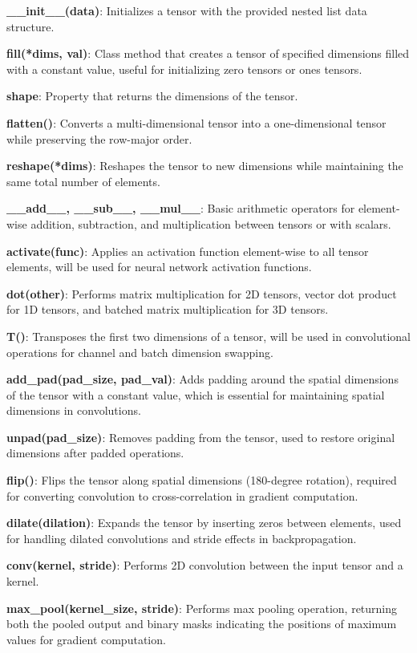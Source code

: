 \documentclass[conference]{IEEEtran}
\begin{document}
\textbf{\_\_init\_\_(data)}: Initializes a tensor with the provided nested list data structure.

\textbf{fill(*dims, val)}: Class method that creates a tensor of specified dimensions filled with a constant value, useful for initializing zero tensors or ones tensors.

\textbf{shape}: Property that returns the dimensions of the tensor.

\textbf{flatten()}: Converts a multi-dimensional tensor into a one-dimensional tensor while preserving the row-major order.

\textbf{reshape(*dims)}: Reshapes the tensor to new dimensions while maintaining the same total number of elements.

\textbf{\_\_add\_\_, \_\_sub\_\_, \_\_mul\_\_}: Basic arithmetic operators for element-wise addition, subtraction, and multiplication between tensors or with scalars.

\textbf{activate(func)}: Applies an activation function element-wise to all tensor elements, will be used for neural network activation functions.

\textbf{dot(other)}: Performs matrix multiplication for 2D tensors, vector dot product for 1D tensors, and batched matrix multiplication for 3D tensors.

\textbf{T()}: Transposes the first two dimensions of a tensor, will be used in convolutional operations for channel and batch dimension swapping.

\textbf{add\_pad(pad\_size, pad\_val)}: Adds padding around the spatial dimensions of the tensor with a constant value, which is essential for maintaining spatial dimensions in convolutions.

\textbf{unpad(pad\_size)}: Removes padding from the tensor, used to restore original dimensions after padded operations.

\textbf{flip()}: Flips the tensor along spatial dimensions (180-degree rotation), required for converting convolution to cross-correlation in gradient computation.

\textbf{dilate(dilation)}: Expands the tensor by inserting zeros between elements, used for handling dilated convolutions and stride effects in backpropagation.

\textbf{conv(kernel, stride)}: Performs 2D convolution between the input tensor and a kernel.

\textbf{max\_pool(kernel\_size, stride)}: Performs max pooling operation, returning both the pooled output and binary masks indicating the positions of maximum values for gradient computation.
\end{document}
